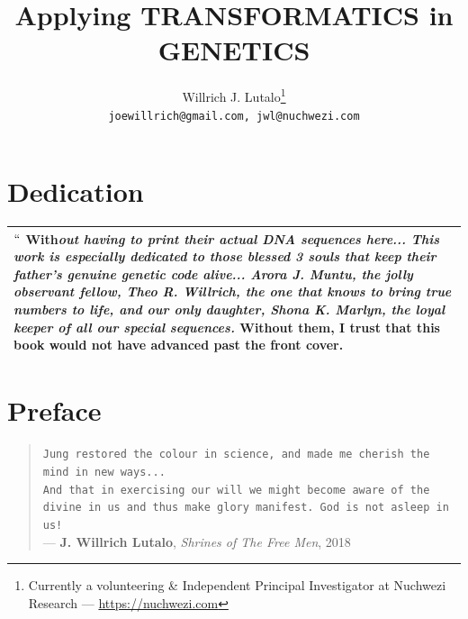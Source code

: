 \documentclass[a4paper, 18pt]{book} %
\title{Applying \textbf{TRANSFORMATICS} in GENETICS}
\author{Willrich J. Lutalo\thanks{Currently a volunteering \& Independent Principal Investigator at Nuchwezi Research --- \url{https://nuchwezi.com}}\\
\texttt{joewillrich@gmail.com, jwl@nuchwezi.com}}
\begin{document}
\frontmatter








\maketitle

\chapter*{Dedication}


\begin{table}[H]
  \centering
  \Huge
	\begin{tabular}[t]{|p{}}
$   ``$ \textbf{With}\textit{out having to print their actual DNA sequences here...    \Large This work is especially dedicated to those blessed 3 souls that keep their father's genuine genetic code alive...  \textbf{Arora J. Muntu}, the jolly observant fellow, \textbf{Theo R. Willrich}, the one that knows to bring true numbers to life, and our only daughter, \textbf{Shona K. Marlyn}, the loyal keeper of all our special sequences.} Without them, I trust that this \textbf{book would not have advanced past the front cover.}\\
	\hline
	              
\end{tabular}
  \label{TABDEDC}
\end{table}

\tableofcontents

\listoffigures

\listoftables

\newpage

\Large


\chapter{Preface}

\begin{quotation}
\noindent \texttt{Jung restored the colour in science, and made me cherish the mind in new ways...}\\
\texttt{And that in exercising our will we might become aware of the divine in us and thus make glory manifest. God is not asleep in us!}\\
\hspace*{\fill} --- \textbf{J. Willrich Lutalo}, \textit{Shrines of The Free Men}, 2018\cite{shrinesjwl}
\end{quotation}
\end{document}
